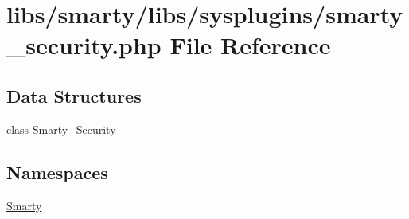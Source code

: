 \hypertarget{smarty__security_8php}{}\section{libs/smarty/libs/sysplugins/smarty\+\_\+security.php File Reference}
\label{smarty__security_8php}
\subsection*{Data Structures}
\begin{DoxyCompactItemize}
\item 
class \hyperlink{class_smarty___security}{Smarty\+\_\+\+Security}
\end{DoxyCompactItemize}
\subsection*{Namespaces}
\begin{DoxyCompactItemize}
\item 
 \hyperlink{namespace_smarty}{Smarty}
\end{DoxyCompactItemize}

